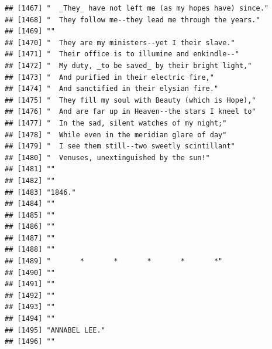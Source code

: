 \documentclass{article}\usepackage[]{graphicx}\usepackage[]{color}
\makeatletter
\newenvironment{kframe}{%
 \def\at@end@of@kframe{}%
 \ifinner\ifhmode%
  \def\at@end@of@kframe{\end{minipage}}%
  \begin{minipage}{\columnwidth}%
 \fi\fi%
 \def\FrameCommand##1{\hskip\@totalleftmargin \hskip-\fboxsep
 \colorbox{shadecolor}{##1}\hskip-\fboxsep
     \hskip-\linewidth \hskip-\@totalleftmargin \hskip\columnwidth}%
 \MakeFramed {\advance\hsize-\width
   \@totalleftmargin\z@ \linewidth\hsize
   \@setminipage}}%
 {\par\unskip\endMakeFramed%
 \at@end@of@kframe}
\newenvironment{knitrout}{}{} %
\makeatother
\begin{document}
\begin{knitrout}
\begin{kframe}
\begin{verbatim}
## [1467] "  _They_ have not left me (as my hopes have) since."                         
## [1468] "  They follow me--they lead me through the years."                           
## [1469] ""                                                                            
## [1470] "  They are my ministers--yet I their slave."                                 
## [1471] "  Their office is to illumine and enkindle--"                                
## [1472] "  My duty, _to be saved_ by their bright light,"                             
## [1473] "  And purified in their electric fire,"                                      
## [1474] "  And sanctified in their elysian fire."                                     
## [1475] "  They fill my soul with Beauty (which is Hope),"                            
## [1476] "  And are far up in Heaven--the stars I kneel to"                            
## [1477] "  In the sad, silent watches of my night;"                                   
## [1478] "  While even in the meridian glare of day"                                   
## [1479] "  I see them still--two sweetly scintillant"                                 
## [1480] "  Venuses, unextinguished by the sun!"                                       
## [1481] ""                                                                            
## [1482] ""                                                                            
## [1483] "1846."                                                                       
## [1484] ""                                                                            
## [1485] ""                                                                            
## [1486] ""                                                                            
## [1487] ""                                                                            
## [1488] ""                                                                            
## [1489] "       *       *       *       *       *"                                    
## [1490] ""                                                                            
## [1491] ""                                                                            
## [1492] ""                                                                            
## [1493] ""                                                                            
## [1494] ""                                                                            
## [1495] "ANNABEL LEE."                                                                
## [1496] ""                                                                            

\end{verbatim}
\end{kframe}
\end{knitrout}
\end{document}
